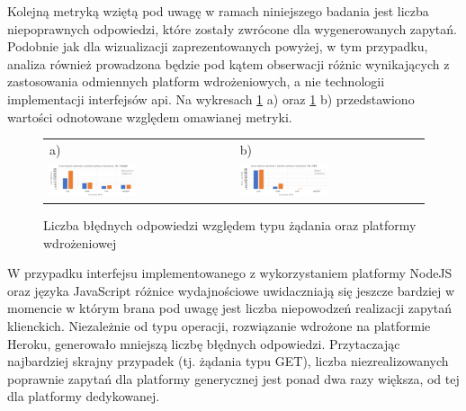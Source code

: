 Kolejną metryką wziętą pod uwagę w ramach niniejszego badania jest liczba niepoprawnych odpowiedzi, które zostały zwrócone dla wygenerowanych zapytań. Podobnie jak dla wizualizacji zaprezentowanych powyżej, w tym przypadku, analiza również prowadzona będzie pod kątem obserwacji różnic wynikających z zastosowania odmiennych platform wdrożeniowych, a nie technologii implementacji interfejsów api. Na wykresach \ref{fig:errors-for-plaforms} a) oraz \ref{fig:errors-for-plaforms} b) przedstawiono wartości odnotowane względem omawianej metryki.

\begin{figure}[htb]
  \centering
	\begin{tabular}{@{}ll@{}}
    a) & b) \\
    \includegraphics[width=0.49\textwidth]{rys05/nodejs-errors.pdf} & \includegraphics[width=0.49\textwidth]{rys05/dotnet-errors.pdf} \\
	\end{tabular}
  \caption{Liczba błędnych odpowiedzi względem typu żądania oraz platformy wdrożeniowej}
  \label{fig:errors-for-plaforms}
\end{figure}


W przypadku interfejsu implementowanego z wykorzystaniem platformy NodeJS oraz języka JavaScript różnice wydajnościowe uwidaczniają się jeszcze bardziej w momencie w którym brana pod uwagę jest liczba niepowodzeń realizacji zapytań klienckich. Niezależnie od typu operacji, rozwiązanie wdrożone na platformie Heroku, generowało mniejszą liczbę błędnych odpowiedzi. Przytaczając najbardziej skrajny przypadek (tj. żądania typu GET), liczba niezrealizowanych poprawnie zapytań dla platformy generycznej jest ponad dwa razy większa, od tej dla platformy dedykowanej.

